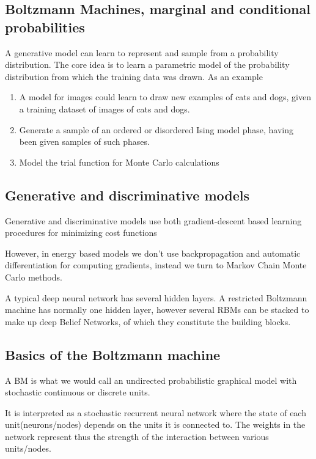 \documentclass[%
oneside,                 %
final,                   %
10pt]{article}
\begin{document}
\subsection{Boltzmann Machines, marginal and conditional probabilities}

A generative model can learn to represent and sample from a
probability distribution. The core idea is to learn a parametric model
of the probability distribution from which the training data was
drawn. As an example
\begin{enumerate}
\item A model for images could learn to draw new examples of cats and dogs, given a training dataset of images of cats and dogs.

\item Generate a sample of an ordered or disordered Ising model phase, having been given samples of such phases.

\item Model the trial function for Monte Carlo calculations
\end{enumerate}

\noindent
\subsection{Generative and discriminative models}

Generative and discriminative models use both gradient-descent based
learning procedures for minimizing cost functions

However, in energy based models we don't use backpropagation and automatic
differentiation for computing gradients, instead we turn to Markov
Chain Monte Carlo methods.

A typical deep neural network has several hidden layers. A restricted
Boltzmann machine has normally one hidden layer, however several RBMs can
be stacked to make up deep Belief Networks, of which they constitute
the building blocks.

\subsection{Basics of the Boltzmann machine}
\begin{block}{}
A BM is what we would call an undirected probabilistic graphical model
with stochastic continuous or discrete units.
\end{block}
\begin{block}{}
It is interpreted as a stochastic recurrent neural network where the
state of each unit(neurons/nodes) depends on the units it is connected
to. The weights in the network represent thus the strength of the
interaction between various units/nodes.
\end{block}
\end{document}
